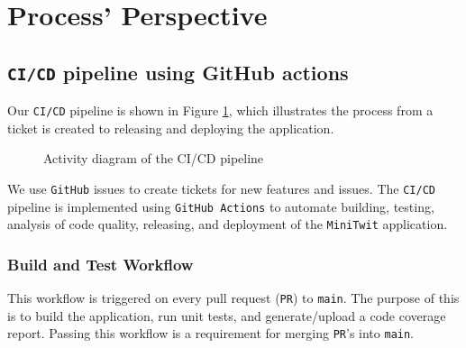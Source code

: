\section{Process' Perspective}
\label{ch:background} 

\subsection{\texttt{CI/CD} pipeline using GitHub actions}
Our \texttt{CI/CD} pipeline is shown in Figure \ref{fig:activity_diagram}, 
which illustrates the process from a ticket is created 
to releasing and deploying the application.
\begin{figure}[h]
      \centering
      \caption{Activity diagram of the CI/CD pipeline}
      \label{fig:activity_diagram}
\end{figure}

We use \texttt{GitHub} issues to create tickets for new features and issues.
The \texttt{CI/CD} pipeline is implemented using \texttt{GitHub Actions} 
to automate building, testing, analysis of code quality, releasing, 
and deployment of the \texttt{MiniTwit} application.

\subsubsection{Build and Test Workflow}
This workflow is triggered on every pull request (\texttt{PR}) to \texttt{main}.
The purpose of this is to build the application, run unit tests, 
and generate/upload a code coverage report.
Passing this workflow is a requirement for merging \texttt{PR}'s into \texttt{main}.

